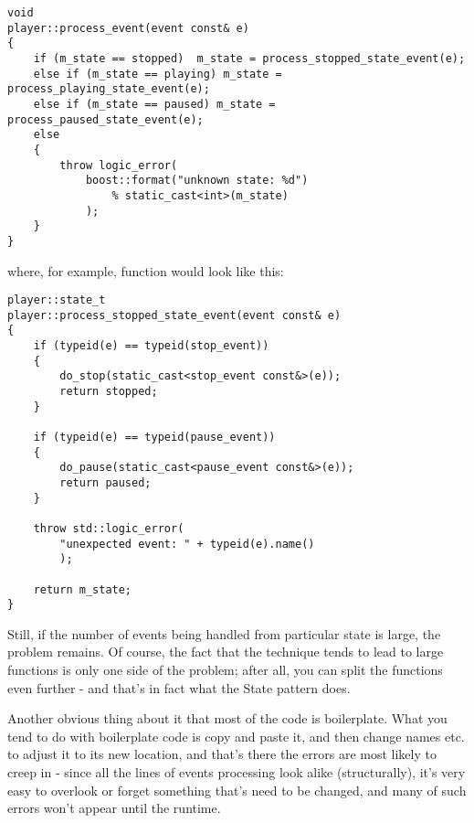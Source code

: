 \documentclass{netobjectdays}
\begin{document}

{\footnotesize
\begin{verbatim}
void
player::process_event(event const& e)
{
    if (m_state == stopped)  m_state = process_stopped_state_event(e);
    else if (m_state == playing) m_state = process_playing_state_event(e);
    else if (m_state == paused) m_state = process_paused_state_event(e);
    else
    {
        throw logic_error(
            boost::format("unknown state: %d")
                % static_cast<int>(m_state)
            );
    }
}
\end{verbatim}
}

where, for example,  
function would look like this:

{\footnotesize
\begin{verbatim}
player::state_t
player::process_stopped_state_event(event const& e)
{
    if (typeid(e) == typeid(stop_event))
    {
        do_stop(static_cast<stop_event const&>(e));
        return stopped;
    }

    if (typeid(e) == typeid(pause_event))
    {
        do_pause(static_cast<pause_event const&>(e));
        return paused;
    }

    throw std::logic_error(
        "unexpected event: " + typeid(e).name()
        );

    return m_state;
}
\end{verbatim}
}

Still, if the number of events being handled from particular 
state is large, the problem remains. Of course, the fact that 
the technique tends to lead to large functions is only one 
side of the problem; after all, you can split the functions 
even further - and that's in fact what the State pattern does.

Another obvious thing about it that most of the code is 
boilerplate. What you tend to do with boilerplate code is copy 
and paste it, and then change names etc. to adjust it to its new 
location, and that's there the errors are most likely to creep in
- since all the lines of events processing look alike 
(structurally), it's very easy to overlook or forget something 
that's need to be changed, and many of such errors won't appear 
until the runtime.
\end{document}
